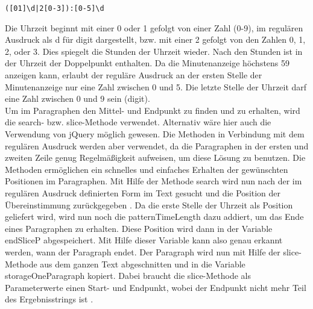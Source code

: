 \begin{verbatim}
([01]\d|2[0-3]):[0-5]\d
\end{verbatim}
Die Uhrzeit beginnt mit einer 0 oder 1 gefolgt von einer Zahl (0-9), im regulären Ausdruck als d für digit dargestellt, bzw. mit einer 2 gefolgt von den Zahlen 0, 1, 2, oder 3. Dies spiegelt die Stunden der Uhrzeit wieder. Nach den Stunden ist in der Uhrzeit der Doppelpunkt enthalten. Da die Minutenanzeige höchstens 59 anzeigen kann, erlaubt der reguläre Ausdruck an der ersten Stelle der Minutenanzeige nur eine Zahl zwischen 0 und 5. Die letzte Stelle der Uhrzeit darf eine Zahl zwischen 0 und 9 sein (digit). \\
Um im Paragraphen den Mittel- und Endpunkt zu finden und zu erhalten, wird die search- bzw. slice-Methode verwendet. Alternativ wäre hier auch die Verwendung von jQuery möglich gewesen. Die Methoden in Verbindung mit dem regulären Ausdruck werden aber verwendet, da die Paragraphen in der ersten und zweiten Zeile genug Regelmäßigkeit aufweisen, um diese Lösung zu benutzen. Die Methoden ermöglichen ein schnelles und einfaches Erhalten der gewünschten Positionen im Paragraphen.
Mit Hilfe der Methode search wird nun nach der im regulären Ausdruck definierten Form im Text gesucht und die Position der Übereinstimmung zurückgegeben \cite{search}. Da die erste Stelle der Uhrzeit als Position geliefert wird, wird nun noch die patternTimeLength dazu addiert, um das Ende eines Paragraphen zu erhalten. Diese Position wird dann in der Variable endSliceP abgespeichert. Mit Hilfe dieser Variable kann also genau erkannt werden, wann der Paragraph endet. Der Paragraph wird nun mit Hilfe der slice-Methode aus dem ganzen Text abgeschnitten und in die Variable storageOneParagraph kopiert. Dabei braucht die slice-Methode als Parameterwerte einen Start- und Endpunkt, wobei der Endpunkt nicht mehr Teil des Ergebnisstrings ist \cite{slice}. 

